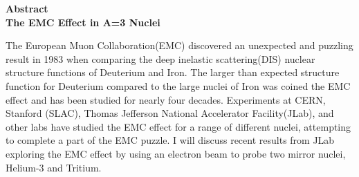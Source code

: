 \begin{center}
	{\large \textbf{Abstract}}\\
	
	{\large \textbf{The EMC Effect in A=3 Nuclei}}\\
\end{center}

The European Muon Collaboration(EMC) discovered an unexpected and puzzling result in 1983 when comparing the deep inelastic scattering(DIS) nuclear structure functions of Deuterium and Iron. The larger than expected structure function for Deuterium compared to the large nuclei of  Iron was coined the EMC effect and has been studied for nearly four decades. Experiments at CERN, Stanford (SLAC), Thomas Jefferson National Accelerator Facility(JLab), and other labs have studied the EMC effect for a range of different nuclei, attempting to complete a part of the EMC puzzle. I will discuss recent results from JLab exploring the EMC effect by using an electron beam to probe two mirror nuclei, Helium-3 and Tritium. 

